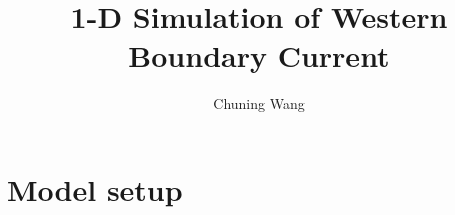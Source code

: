 \documentclass[12pt]{article}
\begin{document}

\title{1-D Simulation of Western Boundary Current}


\author{Chuning Wang}


% 
% 

\maketitle

\section{Model setup}
\label{sec:setup}
\end{document}
